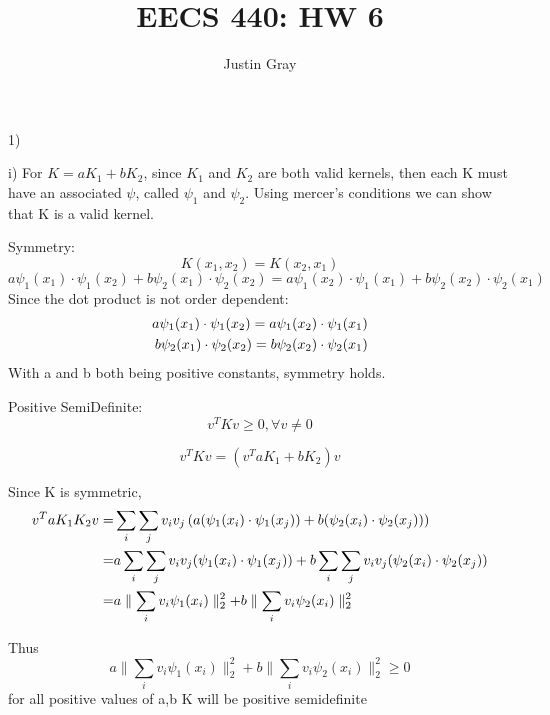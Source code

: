 \documentclass[12pt]{article}
\title{EECS 440: HW 6}
\author{Justin Gray}
\begin{document}
\maketitle
\setcounter{equation}{0}
1) 

i) For $K = aK_1 + bK_2$, since $K_1$ and $K_2$ are both valid kernels, then each K must 
have an associated $\psi$, called $\psi_1$ and $\psi_2$. Using mercer's conditions 
we can show that K is a valid kernel. 

Symmetry: 
\begin{equation}
    K(x_1,x_2) = K(x_2,x_1)
\end{equation}
\begin{equation}
    a\psi_1(x_1)\cdot\psi_1(x_2) + b\psi_2(x_1)\cdot\psi_2(x_2) = a\psi_1(x_2)\cdot\psi_1(x_1) + b\psi_2(x_2)\cdot\psi_2(x_1)
\end{equation}
Since the dot product is not order dependent: 
\begin{align}
    a\psi_1(x_1)\cdot\psi_1(x_2) = a\psi_1(x_2)\cdot\psi_1(x_1) \notag \\
    b\psi_2(x_1)\cdot\psi_2(x_2) = b\psi_2(x_2)\cdot\psi_2(x_1)
\end{align}
With a and b both being positive constants, symmetry holds. 

Positive SemiDefinite: 
\begin{equation}
    v^T K v \geq 0, \forall v\neq 0
\end{equation}

\begin{equation}
    v^T K v = (v^T aK_1+ bK_2) v
\end{equation}

Since K is symmetric, 
\begin{align}
    v^T aK_1K_2 v =& \sum_i\sum_jv_iv_j \left(a(\psi_1(x_i) \cdot \psi_1(x_j))+ b(\psi_2(x_i) \cdot \psi_2(x_j))\right) \notag \\
    =& a \sum_i\sum_jv_iv_j (\psi_1(x_i) \cdot \psi_1(x_j))+ b\sum_i\sum_jv_iv_j(\psi_2(x_i) \cdot \psi_2(x_j)) \notag \\
    =& a \parallel \sum_iv_i \psi_1(x_i)\parallel_2^2 + b\parallel\sum_iv_i \psi_2(x_i)\parallel_2^2
\end{align}

Thus
\begin{equation}
    a \parallel \sum_iv_i \psi_1(x_i)\parallel_2^2 + b\parallel\sum_iv_i \psi_2(x_i)\parallel_2^2 \geq 0
\end{equation}
for all positive values of a,b K will be positive semidefinite
\end{document}
